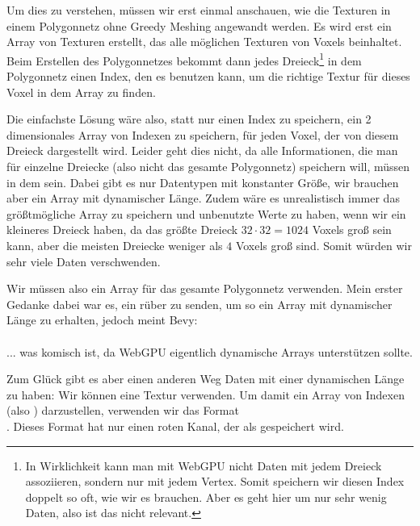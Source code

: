 \pagebreak

Um dies zu verstehen, müssen wir erst einmal anschauen,
wie die Texturen in einem Polygonnetz ohne
Greedy Meshing angewandt werden.
Es wird erst ein Array von Texturen erstellt,
das alle möglichen Texturen von Voxels beinhaltet.
Beim Erstellen des Polygonnetzes bekommt
dann jedes Dreieck\footnote{
	In Wirklichkeit kann man mit WebGPU nicht
	Daten mit jedem Dreieck assoziieren,
	sondern nur mit jedem Vertex.
	Somit speichern wir diesen Index doppelt so
	oft, wie wir es brauchen.
	Aber es geht hier um nur sehr wenig Daten,
	also ist das nicht relevant.
}
in dem Polygonnetz einen Index,
den es benutzen kann, um die richtige Textur für
dieses Voxel in dem Array zu finden.

Die einfachste Lösung wäre also, statt nur
einen Index zu speichern, ein 2 dimensionales Array
von Indexen zu speichern, für jeden Voxel,
der von diesem Dreieck dargestellt wird.
Leider geht dies nicht, da alle Informationen,
die man für einzelne Dreiecke (also nicht das
gesamte Polygonnetz) speichern will, müssen in dem
\href{https://gpuweb.github.io/gpuweb/#enumdef-gpuvertexformat}{}\cite{gpu_vertex_format}
sein.
Dabei gibt es nur Datentypen mit konstanter Größe,
wir brauchen aber ein Array mit dynamischer Länge.
Zudem wäre es unrealistisch immer das größtmögliche
Array zu speichern und unbenutzte Werte zu haben,
wenn wir ein kleineres Dreieck haben, da das größte
Dreieck $32 \cdot 32 = 1024$ Voxels groß sein kann,
aber die meisten Dreiecke weniger als $4$ Voxels
groß sind.
Somit würden wir sehr viele Daten verschwenden.

Wir müssen also ein Array für das gesamte
Polygonnetz verwenden.
Mein erster Gedanke dabei war es, ein 
rüber zu senden, um so ein Array mit dynamischer
Länge zu erhalten, jedoch meint Bevy:\\
\cite{no_runtime_sized}\\
... was komisch ist, da WebGPU eigentlich dynamische
Arrays unterstützen sollte.

Zum Glück gibt es aber einen anderen Weg Daten mit
einer dynamischen Länge zu haben:
Wir können eine Textur verwenden.
Um damit ein Array von Indexen (also )
darzustellen, verwenden wir das Format\\
\href{https://docs.rs/bevy/0.15.0/bevy/render/render_resource/enum.TextureFormat.html#variant.R32Uint}{}\cite{r32uint}.
Dieses Format hat nur einen roten Kanal, der als
 gespeichert wird.

